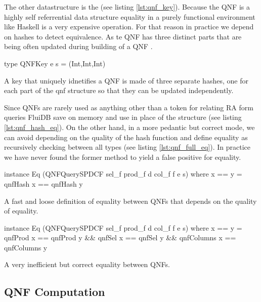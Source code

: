 The other datastructure is the  (see listing
\ref{lst:qnf_key}). Because the QNF is a highly self referrential data
structure equality in a purely functional environment like Haskell is
a very expensive operation. For that reason in practice we depend on
hashes to detect equivalence. As te QNF has three distinct parts that
are being often updated during building of a QNF .

\begin{code}
  \begin{haskellcode}
    type QNFKey e s = (Int,Int,Int)
  \end{haskellcode}
  \caption{\label{lst:qnf_key}A key that uniquely idnetifies a QNF is
    made of three separate hashes, one for each part of the qnf
    structure so that they can be updated independently.}
\end{code}

Since QNFs are rarely used as anything other than a token for relating
RA form queries FluiDB save on memory and use  in place
of the  structure (see listing
\ref{lst:qnf_hash_eq}). On the other hand, in a more pedantic but
correct mode, we can avoid depending on the quality of the hash
function and define equality as recursively checking between all types
(see listing \ref{lst:qnf_full_eq}). In practice we have never found the
former method to yield a false positive for equality.

\begin{code}
  \begin{haskellcode}
    instance Eq (QNFQuerySPDCF sel_f prod_f d col_f f e s) where
      x == y = qnfHash x == qnfHash y
  \end{haskellcode}
  \label{lst:qnf_hash_eq}
  \caption{A fast and loose definition of equality between QNFs that depends on the quality of equality.}
\end{code}

\begin{code}
  \begin{haskellcode}
    instance Eq (QNFQuerySPDCF sel_f prod_f d col_f f e s) where
      x == y = qnfProd x == qnfProd y
        && qnfSel x == qnfSel y
        && qnfColumns x == qnfColumns y
  \end{haskellcode}
  \label{lst:qnf_full_eq}
  \caption{A very inefficient but correct equality between QNFs.}
\end{code}

\subsection{QNF Computation}

